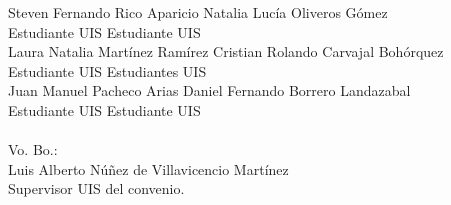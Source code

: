 \documentclass[a4paper,10pt]{article}
\begin{document}
\vspace{2.5cm}
\noindent Steven Fernando Rico Aparicio \hspace{4cm} \noindent Natalia Lucía Oliveros Gómez
\\
\noindent Estudiante UIS \hspace{6.4cm} \noindent Estudiante UIS
\vspace{2.5cm}
\\
\noindent Laura Natalia Martínez Ramírez  \hspace{3.8cm} \noindentn Cristian Rolando Carvajal Bohórquez
\\
\noindent Estudiante UIS \hspace{6.4cm} \noindent Estudiantes UIS
\vspace{2.5cm}
\\
\noindent Juan Manuel Pacheco Arias \hspace{4.5cm} \noindent Daniel Fernando Borrero Landazabal
\\
\noindentn Estudiante UIS \hspace{6.4cm} \noindent Estudiante UIS
\\
\\
\noindentn Vo. Bo.:
\vspace{2.5cm}
\\
\noindentn Luis Alberto Núñez de Villavicencio Martínez
\\
\noindentn Supervisor UIS del convenio.



%  











%
%
\end{document}
